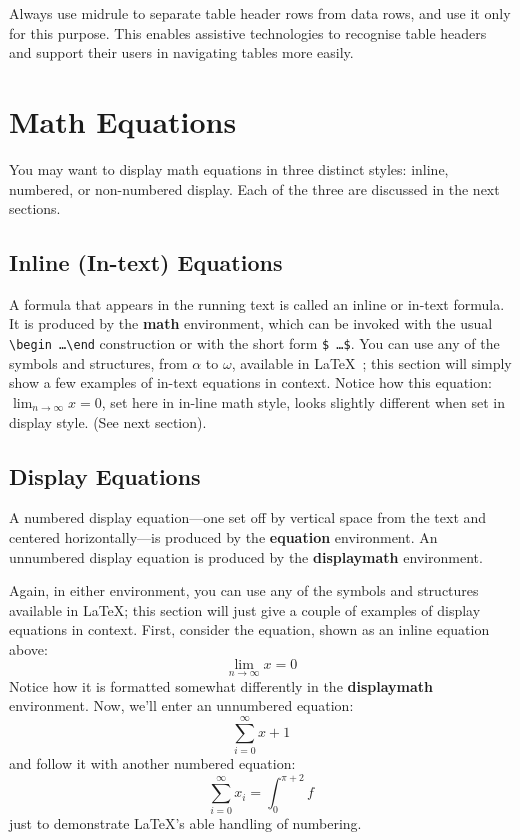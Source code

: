 \documentclass[manuscript, screen]{timtm}
\begin{document}
Always use midrule to separate table header rows from data rows, and
use it only for this purpose. This enables assistive technologies to
recognise table headers and support their users in navigating tables
more easily.

\section{Math Equations}
You may want to display math equations in three distinct styles:
inline, numbered, or non-numbered display.  Each of the three are
discussed in the next sections.

\subsection{Inline (In-text) Equations}
A formula that appears in the running text is called an inline or
in-text formula.  It is produced by the \textbf{math} environment,
which can be invoked with the usual
\texttt{{\textbackslash}begin\,\ldots{\textbackslash}end} construction or with
the short form \texttt{\$\,\ldots\$}. You can use any of the symbols
and structures, from $\alpha$ to $\omega$, available in
\LaTeX~\cite{Lamport:LaTeX}; this section will simply show a few
examples of in-text equations in context. Notice how this equation:
\begin{math}
  \lim_{n\rightarrow \infty}x=0
\end{math},
set here in in-line math style, looks slightly different when
set in display style.  (See next section).

\subsection{Display Equations}
A numbered display equation---one set off by vertical space from the
text and centered horizontally---is produced by the \textbf{equation}
environment. An unnumbered display equation is produced by the
\textbf{displaymath} environment.

Again, in either environment, you can use any of the symbols and
structures available in \LaTeX\@; this section will just give a couple
of examples of display equations in context.  First, consider the
equation, shown as an inline equation above:
\begin{equation}
  \lim_{n\rightarrow \infty}x=0
\end{equation}
Notice how it is formatted somewhat differently in
the \textbf{displaymath}
environment.  Now, we'll enter an unnumbered equation:
\begin{displaymath}
  \sum_{i=0}^{\infty} x + 1
\end{displaymath}
and follow it with another numbered equation:
\begin{equation}
  \sum_{i=0}^{\infty}x_i=\int_{0}^{\pi+2} f
\end{equation}
just to demonstrate \LaTeX's able handling of numbering.
\end{document}
